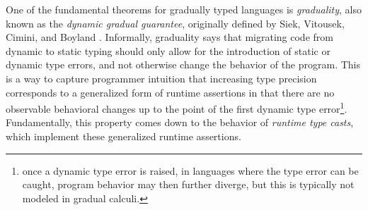 

One of the fundamental theorems for gradually typed languages is
\emph{graduality}, also known as the \emph{dynamic gradual guarantee},
originally defined by Siek, Vitousek, Cimini, and Boyland
\cite{siek_et_al:LIPIcs:2015:5031, new-ahmed2018}.
%
Informally, graduality says that migrating code from dynamic to
static typing should only allow for the introduction of static or
dynamic type errors, and not otherwise change the behavior of the
program.
%
This is a way to capture programmer intuition that increasing type
precision corresponds to a generalized form of runtime assertions in
that there are no observable behavioral changes up to the point of the
first dynamic type error\footnote{once a dynamic type error is raised,
in languages where the type error can be caught, program behavior may
then further diverge, but this is typically not modeled in gradual
calculi.}.
%
Fundamentally, this property comes down to the behavior of
\emph{runtime type casts}, which implement these generalized runtime
assertions.


